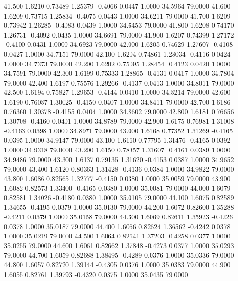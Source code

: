   41.500   1.6210   0.73489   1.25379  -0.4066   0.0447   1.0000  34.5964  79.0000
  41.600   1.6209   0.73715   1.25834  -0.4075   0.0443   1.0000  34.6211  79.0000
  41.700   1.6209   0.73942   1.26285  -0.4083   0.0439   1.0000  34.6453  79.0000
  41.800   1.6208   0.74170   1.26731  -0.4092   0.0435   1.0000  34.6691  79.0000
  41.900   1.6207   0.74399   1.27172  -0.4100   0.0431   1.0000  34.6923  79.0000
  42.000   1.6205   0.74629   1.27607  -0.4108   0.0427   1.0000  34.7151  79.0000
  42.100   1.6204   0.74861   1.28034  -0.4116   0.0424   1.0000  34.7373  79.0000
  42.200   1.6202   0.75095   1.28454  -0.4123   0.0420   1.0000  34.7591  79.0000
  42.300   1.6199   0.75333   1.28865  -0.4131   0.0417   1.0000  34.7804  79.0000
  42.400   1.6197   0.75576   1.29266  -0.4137   0.0413   1.0000  34.8011  79.0000
  42.500   1.6194   0.75827   1.29653  -0.4144   0.0410   1.0000  34.8214  79.0000
  42.600   1.6190   0.76087   1.30025  -0.4150   0.0407   1.0000  34.8411  79.0000
  42.700   1.6186   0.76360   1.30378  -0.4155   0.0404   1.0000  34.8602  79.0000
  42.800   1.6181   0.76656   1.30708  -0.4160   0.0401   1.0000  34.8789  79.0000
  42.900   1.6175   0.76981   1.31008  -0.4163   0.0398   1.0000  34.8971  79.0000
  43.000   1.6168   0.77352   1.31269  -0.4165   0.0395   1.0000  34.9147  79.0000
  43.100   1.6160   0.77795   1.31476  -0.4165   0.0392   1.0000  34.9318  79.0000
  43.200   1.6150   0.78357   1.31607  -0.4161   0.0389   1.0000  34.9486  79.0000
  43.300   1.6137   0.79135   1.31620  -0.4153   0.0387   1.0000  34.9652  79.0000
  43.400   1.6120   0.80363   1.31428  -0.4136   0.0384   1.0000  34.9822  79.0000
  43.800   1.6086   0.82565   1.32777  -0.4150   0.0380   1.0000  35.0059  79.0000
  43.900   1.6082   0.82573   1.33400  -0.4165   0.0380   1.0000  35.0081  79.0000
  44.000   1.6079   0.82581   1.34026  -0.4180   0.0380   1.0000  35.0105  79.0000
  44.100   1.6075   0.82589   1.34655  -0.4195   0.0379   1.0000  35.0130  79.0000
  44.200   1.6072   0.82600   1.35288  -0.4211   0.0379   1.0000  35.0158  79.0000
  44.300   1.6069   0.82611   1.35923  -0.4226   0.0378   1.0000  35.0187  79.0000
  44.400   1.6066   0.82624   1.36562  -0.4242   0.0378   1.0000  35.0219  79.0000
  44.500   1.6064   0.82641   1.37203  -0.4258   0.0377   1.0000  35.0255  79.0000
  44.600   1.6061   0.82662   1.37848  -0.4273   0.0377   1.0000  35.0293  79.0000
  44.700   1.6059   0.82688   1.38495  -0.4289   0.0376   1.0000  35.0336  79.0000
  44.800   1.6057   0.82720   1.39144  -0.4305   0.0376   1.0000  35.0383  79.0000
  44.900   1.6055   0.82761   1.39793  -0.4320   0.0375   1.0000  35.0435  79.0000
